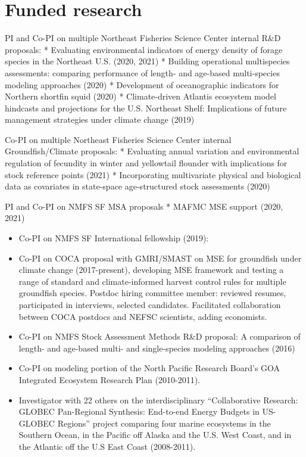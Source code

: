 \documentclass[11pt, a4paper]{awesome-cv}
\begin{document}
\hypertarget{funded-research}{%
\section{Funded research}\label{funded-research}}

PI and Co-PI on multiple Northeast Fisheries Science Center internal
R\&D proposals: * Evaluating environmental indicators of energy density
of forage species in the Northeast U.S. (2020, 2021) * Building
operational multispecies assessments: comparing performance of length-
and age-based multi-species modeling approaches (2020) * Development of
oceanographic indicators for Northern shortfin squid (2020) *
Climate-driven Atlantis ecosystem model hindcasts and projections for
the U.S. Northeast Shelf: Implications of future management strategies
under climate change (2019)

Co-PI on multiple Northeast Fisheries Science Center internal
Groundfish/Climate proposals: * Evaluating annual variation and
environmental regulation of fecundity in winter and yellowtail flounder
with implications for stock reference points (2021) * Incorporating
multivariate physical and biological data as covariates in state-space
age-structured stock assessments (2020)

PI and Co-PI on NMFS SF MSA proposals * MAFMC MSE support (2020, 2021)

\begin{itemize}
\item
  Co-PI on NMFS SF International fellowship (2019):
\item
  Co-PI on COCA proposal with GMRI/SMAST on MSE for groundfish under
  climate change (2017-present), developing MSE framework and testing a
  range of standard and climate-informed harvest control rules for
  multiple groundfish species. Postdoc hiring committee member: reviewed
  resumes, participated in interviews, selected candidates. Facilitated
  collaboration between COCA postdocs and NEFSC scientists, adding
  economists.
\item
  Co-PI on NMFS Stock Assessment Methods R\&D proposal: A comparison of
  length- and age-based multi- and single-species modeling approaches
  (2016)
\item
  Co-PI on modeling portion of the North Pacific Research Board's GOA
  Integrated Ecosystem Research Plan (2010-2011).
\item
  Investigator with 22 others on the interdisciplinary ``Collaborative
  Research: GLOBEC Pan-Regional Synthesis: End-to-end Energy Budgets in
  US-GLOBEC Regions'' project comparing four marine ecosystems in the
  Southern Ocean, in the Pacific off Alaska and the U.S. West Coast, and
  in the Atlantic off the U.S East Coast (2008-2011).
\end{itemize}
\end{document}
